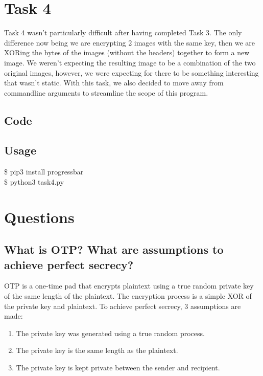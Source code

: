 \documentclass[11pt]{article}
\begin{document}
\section{Task 4}
  Task 4 wasn't particularly difficult after having completed Task 3. The only
  difference now being we are encrypting 2 images with the same key, then we are
  XORing the bytes of the images (without the headers) together to form a new image.
  We weren't expecting the resulting image to be a combination of the two original images, 
  however, we were expecting for there to be something interesting that wasn't static. 
  With this task, we also decided to move away from commandline arguments to
  streamline the scope of this program. 
  \subsection{Code}
  \subsection{Usage}
    {\tt\begin{tabbing}                                                                                                                                                                     
      \$ pip3 install progressbar\\
      \$ python3 task4.py\\
      \end{tabbing}}

\section{Questions}

  \subsection{What is OTP? What are assumptions to achieve perfect secrecy?}
  OTP is a one-time pad that encrypts plaintext using a true random private 
  key of the same length of the plaintext.
  The encryption process is a simple XOR of the private key and plaintext.
  To achieve perfect secrecy, 3 assumptions are made: 
  \begin{enumerate}
    \item The private key was generated using a true random process. 
    \item The private key is the same length as the plaintext. 
    \item The private key is kept private between the sender and recipient.
  \end{enumerate}
\end{document}
